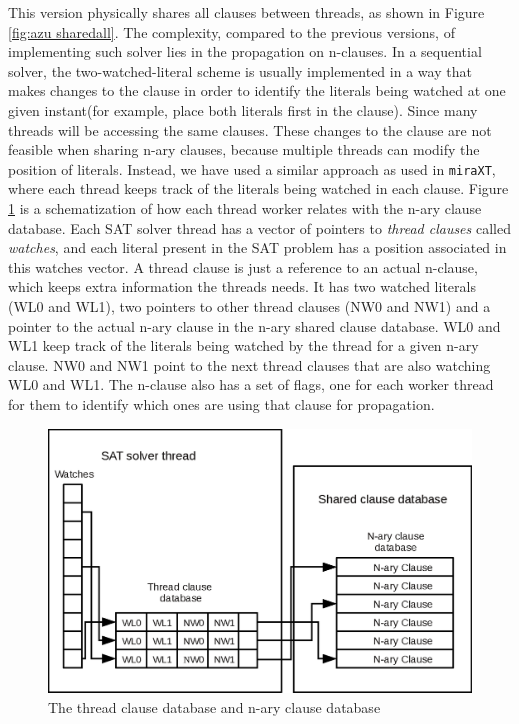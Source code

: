 \documentclass[12pt]{diicc}
\begin{document}
This version physically shares all clauses between threads, as shown in Figure \ref{fig:azu sharedall}. The complexity, compared to the previous versions, of implementing such solver lies in the propagation on n-clauses. In a sequential solver, the two-watched-literal
scheme is usually implemented in a way that makes changes to the clause in order to identify
the literals being watched at one given instant(for example, place
both literals first in the clause). Since many threads will be
accessing the same clauses. These changes to the clause are not
feasible when sharing n-ary clauses, because multiple threads can modify the position of literals. Instead, we have used a similar 
approach as used in
{\tt miraXT}, where each thread keeps track of the literals being
watched in each clause. Figure \ref{fig:azu design} is a
schematization of how each thread worker relates with the n-ary
clause database. Each SAT solver thread has a vector of pointers
to \textit{thread clauses} called \textit{watches}, and each literal present
in the SAT problem has a position associated in this watches vector.
A thread clause is just a reference to an actual n-clause, which keeps extra information the threads needs. It has two watched literals (WL0 and WL1), two
pointers to other thread clauses (NW0 and NW1) and a pointer to
the actual n-ary clause in the n-ary shared clause database. WL0 and WL1 keep
track of the literals being watched by the thread for a given n-ary
clause. NW0 and NW1 point to the next thread clauses that are also 
watching WL0 and WL1. The n-clause also has a set of flags, one for 
each worker thread for them to identify which ones are using that clause 
for propagation.

\begin{figure}[tp]
  \centering
  \includegraphics[scale=0.6]{AzuDICI_design}
  \caption{The thread clause database and n-ary clause database}
  \label{fig:azu design}
\end{figure}
\end{document}
